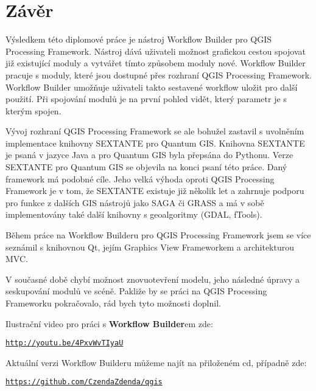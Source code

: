 \chapter*{Závěr}
Výsledkem této diplomové práce je nástroj Workflow Builder pro QGIS Processing Framework. Nástroj dává uživateli možnost  grafickou cestou spojovat již existující moduly a vytvářet tímto způsobem moduly nové. Workflow Builder pracuje s moduly, které jsou dostupné přes rozhraní QGIS Processing Framework. Workflow Builder umožňuje uživateli takto sestavené workflow uložit pro další použití. Při spojování modulů je na první pohled vidět, který parametr je s kterým spojen.

Vývoj rozhraní QGIS Processing Framework se ale bohužel zastavil s uvolněním implementace knihovny SEXTANTE pro Quantum GIS. Knihovna SEXTANTE je psaná v jazyce Java a pro Quantum GIS byla přepsána do Pythonu. Verze {SEXTANTE} pro Quantum GIS se objevila na konci psaní této práce. Daný framework má podobné cíle. Jeho velká výhoda oproti QGIS Processing Framework je v tom, že SEXTANTE existuje již několik let a zahrnuje podporu pro funkce z dalších GIS nástrojů jako SAGA či GRASS a má v sobě implementovány také další knihovny s geoalgoritmy (GDAL, fTools).

Během práce na Workflow Builderu pro QGIS Processing Framework jsem se více seznámil s knihovnou Qt, jejím Graphics View Frameworkem a architekturou MVC. 

V současné době chybí možnost znovuotevření modelu, jeho následné úpravy a seskupování modulů ve scéně. Pakliže by se práci na QGIS Processing Frameworku pokračovalo, rád bych tyto možnosti doplnil.

Ilustrační video pro práci s \textbf{Workflow Builder}em zde:

\begin{center}
	\href{http://youtu.be/4PxvWvTIyaU}{\texttt{http://youtu.be/4PxvWvTIyaU}}
\end{center}
 
\newpage
Aktuální verzi Workflow Builderu můžeme najít na přiloženém cd, případně zde:

\begin{center}
	\href{https://github.com/CzendaZdenda/qgis}{\texttt{https://github.com/CzendaZdenda/qgis}}
\end{center}